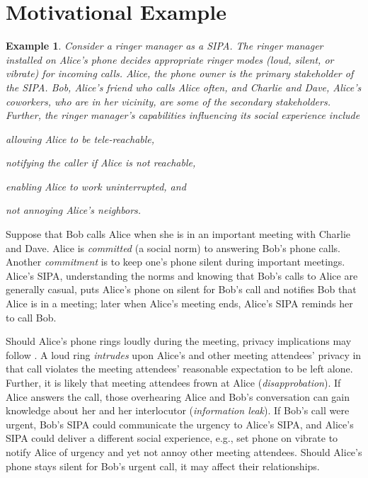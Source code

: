 \documentclass[11pt,          %
               phd,           %
               onehalfspacing %
               ]{ncsuthesis}
\newtheorem{example}{Example}
\begin{document}
\section{Motivational Example}
\begin{example}
\label{ex:intro-ringer-meeting} 
Consider a ringer manager as a SIPA. The ringer manager installed on 
Alice's phone decides appropriate ringer modes (loud, silent, or 
vibrate) for incoming calls. Alice, the phone owner is the 
primary stakeholder of the SIPA. Bob, Alice's friend who 
calls Alice often, and Charlie and Dave, Alice's coworkers, who are in 
her vicinity, are some of the secondary stakeholders. Further, the ringer 
manager's capabilities influencing its social experience include
\begin{enumerate*}[label=(\arabic*)]
\item allowing Alice to be tele-reachable, 
\item notifying the caller if Alice is not reachable,
\item enabling Alice to work uninterrupted, and
\item not annoying Alice's neighbors.
\end{enumerate*}
\end{example}

Suppose that Bob calls Alice when she is in an important meeting with
Charlie and Dave. Alice is \emph{committed} (a social norm)
to answering Bob's phone calls. Another \emph{commitment} is to keep
one's phone silent during important meetings. Alice's SIPA,
understanding the norms and knowing that Bob's calls to Alice are
generally casual, puts Alice's phone on silent for Bob's call and
notifies Bob that Alice is in a meeting; later when Alice's meeting
ends, Alice's SIPA reminds her to call Bob.

Should Alice's phone rings loudly during the meeting, privacy
implications may follow
\citep{Murukannaiah-IC16-Engineering,solove-2006-taxonomy}. A loud ring
\emph{intrudes} upon Alice's and other meeting attendees' privacy in
that call violates the meeting attendees' reasonable expectation to be
left alone. Further, it is likely that meeting attendees frown at Alice
(\emph{disapprobation}). If Alice answers the call, those overhearing
Alice and Bob's conversation can gain knowledge about her and her
interlocutor (\emph{information leak}). If Bob's call were urgent, Bob's
SIPA could communicate the urgency to Alice's SIPA, and Alice's SIPA
could deliver a different social experience, e.g., set phone on vibrate
to notify Alice of urgency and yet not annoy other meeting attendees.
Should Alice's phone stays silent for Bob's urgent call, it may affect
their relationships.
\end{document}
